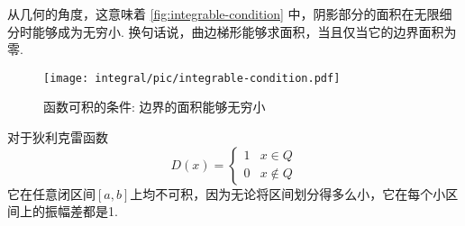 从几何的角度，这意味着 \autoref{fig:integrable-condition} 中，阴影部分的面积在无限细分时能够成为无穷小. 换句话说，曲边梯形能够求面积，当且仅当它的边界面积为零.
\begin{figure}
  \centering
  \texttt{[image: integral/pic/integrable-condition.pdf]}
  \caption{函数可积的条件: 边界的面积能够无穷小}
  \label{fig:integrable-condition}
\end{figure}



\begin{example}
  对于狄利克雷函数
  \begin{equation*}
    D(x)=
    \begin{cases}
      1 & x \in Q \\
      0 & x \notin Q
    \end{cases}
  \end{equation*}
  它在任意闭区间$[a,b]$上均不可积，因为无论将区间划分得多么小，它在每个小区间上的振幅差都是1.
\end{example}

